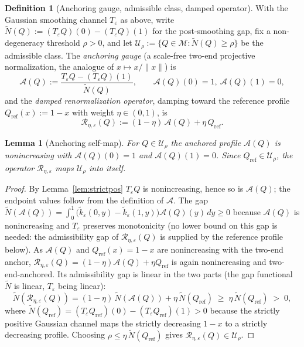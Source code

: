 \documentclass[11pt]{article}
\theoremstyle{plain}
\newtheorem{lemma}[theorem]{Lemma}
\theoremstyle{definition}
\newtheorem{definition}[theorem]{Definition}
\theoremstyle{remark}
\newcommand{\Rc}{\mathcal R}
\newcommand{\Ac}{\mathcal A}
\begin{document}
\begin{definition}[Anchoring gauge, admissible class, damped operator]\label{def:Reta}
With the Gaussian smoothing channel $T_\varepsilon$ as above, write $\tilde N(Q):=(T_\varepsilon Q)(0)-(T_\varepsilon Q)(1)$ for the post-smoothing gap, fix a non-degeneracy threshold $\rho>0$, and let $\mathcal U_\rho:=\{Q\in\mathcal M:\tilde N(Q)\ge\rho\}$ be the admissible class. The \emph{anchoring gauge} (a scale-free two-end projective normalization, the analogue of $x\mapsto x/\lVert x\rVert$) is
\[
\Ac(Q):=\frac{T_\varepsilon Q-(T_\varepsilon Q)(1)}{\tilde N(Q)},\qquad \Ac(Q)(0)=1,\ \Ac(Q)(1)=0,
\]
and the \emph{damped renormalization operator}, damping toward the reference profile $Q_{\mathrm{ref}}(x):=1-x$ with weight $\eta\in(0,1)$, is
\[
\Rc_{\eta,\varepsilon}(Q):=(1-\eta)\,\Ac(Q)+\eta\,Q_{\mathrm{ref}}.
\]
\end{definition}

\begin{lemma}[Anchoring self-map]\label{lem:anchor}
For $Q\in\mathcal U_\rho$ the anchored profile $\Ac(Q)$ is nonincreasing with $\Ac(Q)(0)=1$ and $\Ac(Q)(1)=0$. Since $Q_{\mathrm{ref}}\in\mathcal U_\rho$, the operator $\Rc_{\eta,\varepsilon}$ maps $\mathcal U_\rho$ into itself.
\end{lemma}
\begin{proof}
By Lemma~\ref{lem:strictpos} $T_\varepsilon Q$ is nonincreasing, hence so is $\Ac(Q)$; the endpoint values follow from the definition of $\Ac$. The gap $\tilde N(\Ac(Q))=\int_0^1\big(\tilde k_\varepsilon(0,y)-\tilde k_\varepsilon(1,y)\big)\Ac(Q)(y)\,dy\ge0$ because $\Ac(Q)$ is nonincreasing and $T_\varepsilon$ preserves monotonicity (no lower bound on this gap is needed: the admissibility gap of $\Rc_{\eta,\varepsilon}(Q)$ is supplied by the reference profile below). As $\Ac(Q)$ and $Q_{\mathrm{ref}}(x)=1-x$ are nonincreasing with the two-end anchor, $\Rc_{\eta,\varepsilon}(Q)=(1-\eta)\Ac(Q)+\eta Q_{\mathrm{ref}}$ is again nonincreasing and two-end-anchored. Its admissibility gap is linear in the two parts (the gap functional $\tilde N$ is linear, $T_\varepsilon$ being linear):
\[
\tilde N(\Rc_{\eta,\varepsilon}(Q))=(1-\eta)\,\tilde N(\Ac(Q))+\eta\,\tilde N(Q_{\mathrm{ref}})\;\ge\;\eta\,\tilde N(Q_{\mathrm{ref}})\;>\;0,
\]
where $\tilde N(Q_{\mathrm{ref}})=(T_\varepsilon Q_{\mathrm{ref}})(0)-(T_\varepsilon Q_{\mathrm{ref}})(1)>0$ because the strictly positive Gaussian channel maps the strictly decreasing $1-x$ to a strictly decreasing profile. Choosing $\rho\le\eta\,\tilde N(Q_{\mathrm{ref}})$ gives $\Rc_{\eta,\varepsilon}(Q)\in\mathcal U_\rho$.
\end{proof}
\end{document}
